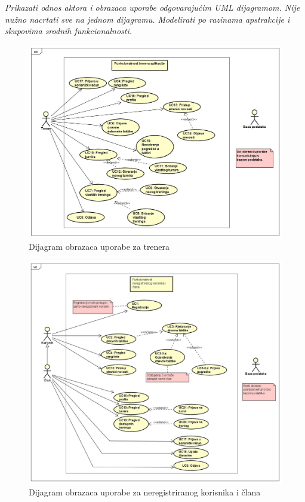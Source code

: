 					\textit{Prikazati odnos aktora i obrazaca uporabe odgovarajućim UML dijagramom. Nije nužno nacrtati sve na jednom dijagramu. Modelirati po razinama apstrakcije i skupovima srodnih funkcionalnosti.}
				\eject		
				
								
				
		\begin{figure}[H]
			\centerfloat
			\includegraphics[scale=0.41]{dijagrami/UseCaseTrener.jpg} %
			\caption{Dijagram obrazaca uporabe za trenera}
			\label{fig:DOU_T}
		\end{figure}
		
		
		\begin{figure}[H]
			\centerfloat
			\includegraphics[scale=0.37]{dijagrami/UseCaseKorisnikClan.jpg} %
			\caption{Dijagram obrazaca uporabe za neregistriranog korisnika i člana}
			\label{fig:DOU_KC}
		\end{figure}
		
